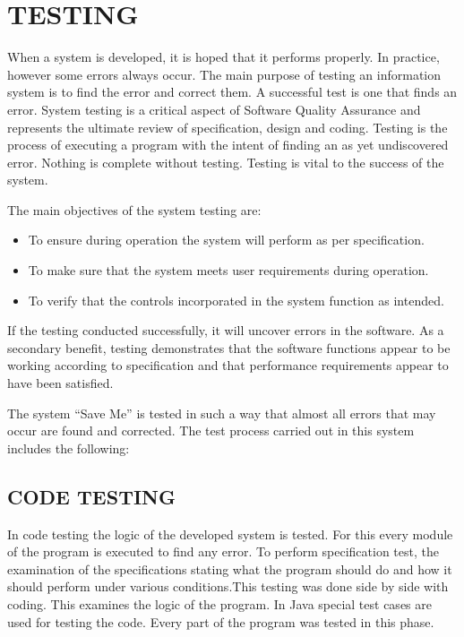 \documentclass[12pt,a4paper,oneside]{report}
\begin{document}
{\newpage
\chapter{TESTING}
\par When a system is developed, it is hoped that it performs properly. In practice, however some errors always occur. The main purpose of testing an information system is to find the error and correct them. A successful test is one that finds an error. System testing is a critical aspect of Software Quality Assurance and represents the ultimate review of specification, design and coding. Testing is the process of executing a program with the intent of finding an as yet undiscovered error. Nothing is complete without testing. Testing is vital to the success of the system.\\
\par The main objectives of the system testing are:\\
\begin{itemize}
\item To ensure during operation the system will perform as per specification. 
\item To make sure that the system meets user requirements during operation.
\item To verify that the controls incorporated in the system function as intended.
\end{itemize}
\par If the testing conducted successfully, it will uncover errors in the software. As a secondary benefit, testing demonstrates that the software functions appear to be working according to specification and that performance requirements appear to have been satisfied.\\
\par The system “Save Me” is tested in such a way that almost all errors that may occur are found and corrected. The test process carried out in this system includes the following:\\
\section{CODE TESTING}
\par In code testing the logic of the developed system is tested. For this every module of the program is executed to find any error. To perform specification test, the examination of the specifications stating what the program should do and how it should perform under various conditions.This testing was done side by side with coding. This examines the logic of the program. In Java special test cases are used for testing the code. Every part of the program was tested in this phase.

}
\end{document}

